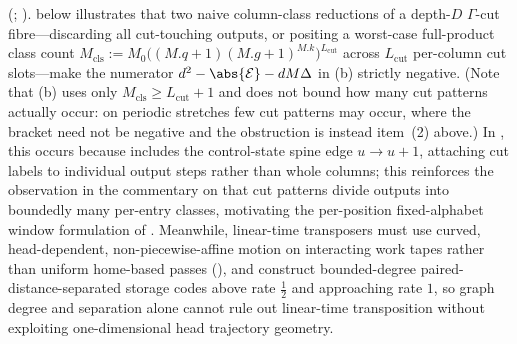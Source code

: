 \begin{remark}
\begin{enumerate}[label=(\arabic*)]
{  (\cite[commentary on Problem~9.4(b)]{SeventeenthPaper2026}; \cite{StorageCodes2026,HighRate2026}).}
   below illustrates that two naive column-class reductions of a
  depth-$D$ $\Gamma$-cut fibre---discarding all cut-touching outputs, or positing a worst-case
  full-product class count $M_{\mathrm{cls}} := M_0\bigl((M.q+1)(M.g+1)^{M.k}\bigr)^{L_{\mathrm{cut}}}$
  across $L_{\mathrm{cut}}$ per-column cut slots---make the numerator $d^2 - \abs{\mathcal{E}} - d M \Delta$
  in (b) strictly negative. (Note that (b)
  uses only $M_{\mathrm{cls}} \ge L_{\mathrm{cut}} + 1$ and does not bound how many cut patterns
  actually occur: on periodic stretches few cut patterns may occur, where the bracket need not be
  negative and the obstruction is instead item~(2) above.) In , this
  occurs because  includes the control-state spine edge $u \to u + 1$, attaching cut
  labels to individual output steps rather than whole columns; this reinforces the observation in the
  commentary on \cite[Problem~9.4(b)]{SeventeenthPaper2026} that cut patterns divide outputs into
  boundedly many per-entry classes, motivating the per-position fixed-alphabet window formulation of
  \cite[Problem~9.4(b)]{SeventeenthPaper2026}. Meanwhile, linear-time transposers must use curved,
  head-dependent, non-piecewise-affine motion on interacting work tapes rather than uniform
  home-based passes (\cite[Theorems~3.10 and~3.12 and Corollary~3.24]{FourthPaper2026}), and
  \cite{StorageCodes2026,HighRate2026}
  construct bounded-degree paired-distance-separated storage codes above rate $\frac{1}{2}$ and
  approaching rate $1$, so graph degree and separation alone cannot rule out linear-time transposition
  without exploiting one-dimensional head trajectory geometry.
\end{enumerate}
\end{remark}

